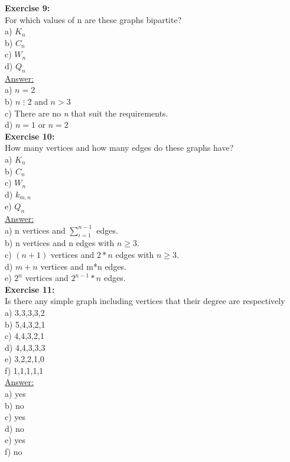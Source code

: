 \documentclass[10pt]{article}
\begin{document}
	\textbf{Exercise 9:}\\
For which values of n are these graphs bipartite?\\
a) $\textit{$K_{n}$}$\\
b) $\textit{$C_{n}$}$\\
c) $\textit{$W_{n}$}$\\
d) $\textit{$Q_{n}$}$\\
\underline{Answer:}\\
a) $\textit{n} = 2$\\
b) $\textit{n}$  $\vdots $ 2  and $\textit{n} > 3$\\
c) There are no \textit{n} that suit the requirements.\\
d) $\textit{n} = 1$ or $\textit{n} = 2$\\

	\textbf{Exercise 10:}\\
How many vertices and how many edges do these graphs have?\\
a) $\textit{$K_{n}$}$\\
b) $\textit{$C_{n}$}$\\
c) $\textit{$W_{n}$}$\\
d) $\textit{$k_{m,n}$}$\\
e) $\textit{$Q_{n}$}$\\
\underline{Answer:}\\
a) n vertices and $\displaystyle\sum_{i=1}^{n-1}$ edges.\\
b) n vertices and n edges with $n \geq 3.$\\
c) $ (n+1)$ vertices and $2*n$ edges with $n\geq 3.$\\
d) $ m+n$ vertices and m*n edges.\\
e) $ 2^{n}$ vertices and $2^{n-1}*n$ edges.\\

	\textbf{Exercise 11:}\\
Is there any simple graph including vertices that their degree are respectively\\
a) 3,3,3,3,2\\
b) 5,4,3,2,1\\
c) 4,4,3,2,1\\
d) 4,4,3,3,3\\
e) 3,2,2,1,0\\
f) 1,1,1,1,1\\
\underline{Answer:}\\
a) yes\\
b) no\\
c) yes\\
d) no\\
e) yes\\
f) no\\
\end{document}
